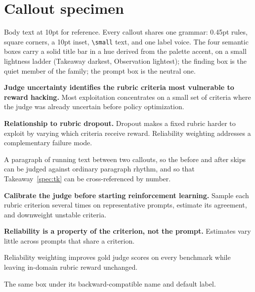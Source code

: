 \documentclass[titlestyle=rigorous]{inkpaper}
\begin{document}
\section{Callout specimen}

Body text at 10pt for reference. Every callout shares one grammar: 0.45pt
rules, square corners, a 10pt inset, \verb|\small| text, and one label voice.
The four semantic boxes carry a solid title bar in a hue derived from the
palette accent, on a small lightness ladder (Takeaway darkest, Observation
lightest); the finding box is the quiet member of the family; the prompt box
is the neutral one.

\begin{takeaway}[label=spec:tk]
\textbf{Judge uncertainty identifies the rubric criteria most vulnerable to
reward hacking.} Most exploitation concentrates on a small set of criteria
where the judge was already uncertain before policy optimization.
\end{takeaway}

\begin{discussion}
\textbf{Relationship to rubric dropout.} Dropout makes a fixed rubric harder
to exploit by varying which criteria receive reward. Reliability weighting
addresses a complementary failure mode.
\end{discussion}

A paragraph of running text between two callouts, so the before and after
skips can be judged against ordinary paragraph rhythm, and so that
Takeaway~\ref{spec:tk} can be cross-referenced by number.

\begin{practicalguidance}
\textbf{Calibrate the judge before starting reinforcement learning.} Sample
each rubric criterion several times on representative prompts, estimate its
agreement, and downweight unstable criteria.
\end{practicalguidance}

\begin{observation}
\textbf{Reliability is a property of the criterion, not the prompt.}
Estimates vary little across prompts that share a criterion.
\end{observation}

\begin{finding}
Reliability weighting improves gold judge scores on every benchmark while
leaving in-domain rubric reward unchanged.
\end{finding}

\begin{keybox}
The same box under its backward-compatible name and default label.
\end{keybox}
\end{document}
